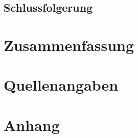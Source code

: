 \documentclass[12pt,a4paper]{article}
\begin{document}
\subsection{Schlussfolgerung}
\section{Zusammenfassung}
\section{Quellenangaben}
\section{Anhang}
\end{document}
